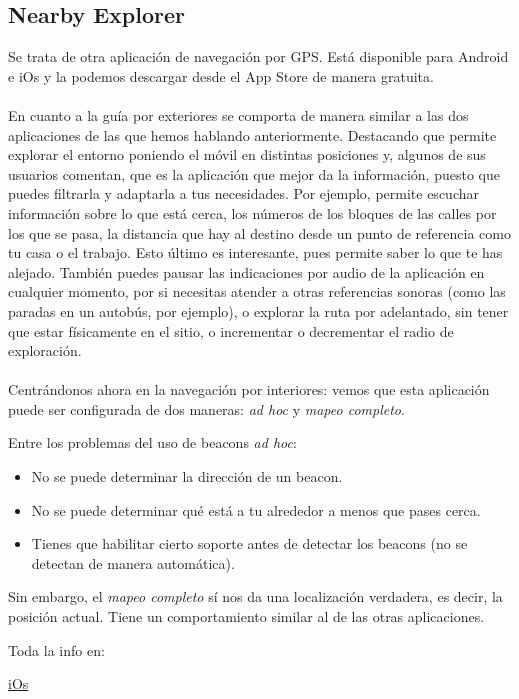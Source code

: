 \documentclass{article}
\begin{document}
	\subsection{Nearby Explorer}
	Se trata de otra aplicación de navegación por GPS. Está disponible para Android e iOs y la podemos descargar desde el App Store de manera gratuita. 
	\\
	\\
	En cuanto a la guía por exteriores se comporta de manera similar a las dos aplicaciones de las que hemos hablando anteriormente. Destacando que permite explorar el entorno poniendo el móvil en distintas posiciones y, algunos de sus usuarios comentan, que es la aplicación que mejor da la información, puesto que puedes filtrarla y adaptarla a tus necesidades. Por ejemplo, permite escuchar información sobre lo que está cerca, los números de los bloques de las calles por los que se pasa, la distancia que hay al destino desde un punto de referencia como tu casa o el trabajo. Esto último es interesante, pues permite saber lo que te has alejado.
	También puedes pausar las indicaciones por audio de la aplicación en cualquier momento, por si necesitas atender a otras referencias sonoras (como las paradas en un autobús, por ejemplo), o explorar la ruta por adelantado, sin tener que estar físicamente en el sitio, o incrementar o decrementar el radio de exploración.
	\\
	\\
	Centrándonos ahora en la navegación por interiores: vemos que esta aplicación puede ser configurada de dos maneras: \textit{ad hoc} y \textit{mapeo completo}.
	
	Entre los problemas del uso de beacons \textit{ad hoc}:
	\begin{itemize}
		\item No se puede determinar la dirección de un beacon. 
		\item No se puede determinar qué está a tu alrededor a menos que pases cerca.
		\item Tienes que habilitar cierto soporte antes de detectar los beacons (no se detectan de manera automática).
	\end{itemize}

	Sin embargo, el \textit{mapeo completo} sí nos da una localización verdadera, es decir, la posición actual. Tiene un comportamiento similar al de las otras aplicaciones.
	
	Toda la info en:
	
	\textcolor{blue}{\href{https://developer.apple.com/accessibility/ios}{iOs}}
	
\end{document}
